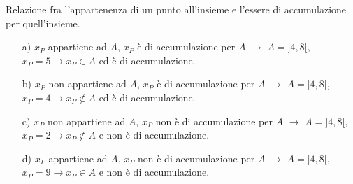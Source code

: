 \begin{esempio}
Relazione fra l'appartenenza di un punto all'insieme e l'essere di 
accumulazione per quell'insieme.
\begin{itemize}
\item[a)] \(x_P\) appartiene ad \(A\), \(x_P\) è di accumulazione per \(A\)
\(\longrightarrow\) \(A=]4,8[\), \(x_P=5\rightarrow x_P\in A\) ed è di 
accumulazione.
\item[b)]  \(x_P\) non appartiene ad \(A\), \(x_P\) è di accumulazione per 
\(A\)
\(\longrightarrow\) \(A=]4,8[\), \(x_P=4\rightarrow x_P\notin A\) ed è di 
accumulazione.
\item[c)]  \(x_P\) non appartiene ad \(A\), \(x_P\) non è di accumulazione 
per \(A\)
\(\longrightarrow\) \(A=]4,8[\), \(x_P=2\rightarrow x_P\notin A\) e non è di 
accumulazione.
\item[d)] \(x_P\) appartiene ad \(A\), \(x_P\) non è di accumulazione per 
\(A\)
\(\longrightarrow\) \(A=]4,8[\), \(x_P=9\rightarrow x_P\in A\) e non 
è di accumulazione.
\end{itemize}
\end{esempio}

